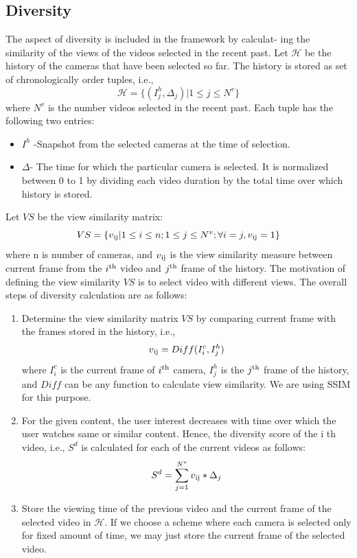 \documentclass{sig-alternate-05-2015}
\begin{document}
\subsection{Diversity}
The aspect of diversity is included in the framework by calculat-
ing the similarity of the views of the videos selected in the recent
past. Let $\mathcal{H}$ be the history of the cameras that have been selected
so far. The history is stored as set of chronologically order tuples,
i.e.,
\begin{equation}
\mathcal{H}= \{(I_j^h, \Delta_j) | 1 \leq j\leq N^v \}
\end{equation}
where $N^v$ is the number videos selected in the recent past. Each
tuple has the following two entries:
\begin{itemize}
\item $I^h$ -Snapshot from the selected cameras at the time of selection.
\item $\Delta$- The time for which the particular camera is selected. It
is normalized between 0 to 1 by dividing each video duration
by the total time over which history is stored.
\end{itemize}
Let $VS$ be the view similarity matrix:
\begin{equation}
VS = \{ v\textsubscript{ij} | 1 \leq i \leq n; 1  \leq j \leq N^v; \forall i = j, v\textsubscript{ij} = 1 \}
\end{equation}
where n is number of cameras, and $v\textsubscript{ij}$ is the view similarity
measure between current frame from the $i\textsuperscript{th}$ video and $j\textsuperscript{th}$ frame
of the history. The motivation of defining the view similarity $VS$ is
to select video with different views. The overall steps of diversity
calculation are as follows:
\begin{enumerate}
\item Determine the view similarity matrix $VS$ by comparing current frame with the frames stored in the history, i.e.,
\begin{equation}
 v\textsubscript{ij} = Diff(I_i^c , I_j^h )
\end{equation}
where $I_i^c$ is the current frame of $i\textsuperscript{th}$ camera, $I_j^h$ is the $j\textsuperscript{th}$
frame of the history, and $Diff$ can be any function to calculate view similarity. We are using SSIM \cite{17} for this purpose.
\item For the given content, the user interest decreases with time
over which the user watches same or similar content. Hence,
the diversity score of the i th video, i.e., $S^d$ is calculated for
each of the current videos as follows:
\begin{equation}
S^d= \sum_{j=1}^{N^v}v\textsubscript{ij} \ast \Delta_j
\end{equation}
\item Store the viewing time of the previous video and the current
frame of the selected video in $\mathcal{H}$. If we choose a scheme
where each camera is selected only for fixed amount of time,
we may just store the current frame of the selected video.
\end{enumerate}
\end{document}
